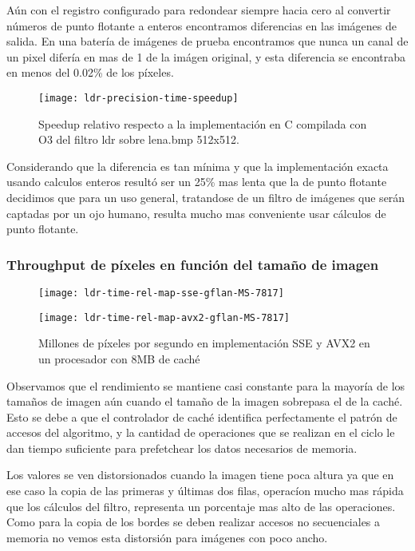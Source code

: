 Aún con el registro  configurado para redondear siempre hacia cero al convertir números de punto flotante a enteros encontramos diferencias en las imágenes de salida. En una batería de imágenes de prueba encontramos que nunca un canal de un pixel difería en mas de 1 de la imágen original, y esta diferencia se encontraba en menos del 0.02\% de los píxeles.

\begin{figure}[H]
    \centering
    \texttt{[image: ldr-precision-time-speedup]}
    \caption{Speedup relativo respecto a la implementación en C compilada con O3 del filtro ldr sobre lena.bmp 512x512.}
    \label{fig:ldr-precision-time-speedup}
\end{figure}

Considerando que la diferencia es tan mínima y que la implementación exacta usando calculos enteros resultó ser un 25\% mas lenta que la de punto flotante decidimos que para un uso general, tratandose de un filtro de imágenes que serán captadas por un ojo humano, resulta mucho mas conveniente usar cálculos de punto flotante.

\subsubsection{Throughput de píxeles en función del tamaño de imagen}

\begin{figure}[H]
    \centering
    \begin{minipage}[t]{0.49\linewidth}
    \centering
    \texttt{[image: ldr-time-rel-map-sse-gflan-MS-7817]}
    \end{minipage}
    \hfill
    \begin{minipage}[t]{0.49\linewidth}
    \centering
    \texttt{[image: ldr-time-rel-map-avx2-gflan-MS-7817]}
    \end{minipage}
    \caption{Millones de píxeles por segundo en implementación SSE y AVX2 en un procesador con 8MB de caché}
    \label{fig:ldr-perdida-precision}
\end{figure}

Observamos que el rendimiento se mantiene casi constante para la mayoría de los tamaños de imagen aún cuando el tamaño de la imagen sobrepasa el de la caché. Esto se debe a que el controlador de caché identifica perfectamente el patrón de accesos del algoritmo, y la cantidad de operaciones que se realizan en el ciclo le dan tiempo suficiente para prefetchear los datos necesarios de memoria.

Los valores se ven distorsionados cuando la imagen tiene poca altura ya que en ese caso la copia de las primeras y últimas dos filas, operacíon mucho mas rápida que los cálculos del filtro, representa un porcentaje mas alto de las operaciones. Como para la copia de los bordes se deben realizar accesos no secuenciales a memoria no vemos esta distorsión para imágenes con poco ancho.


